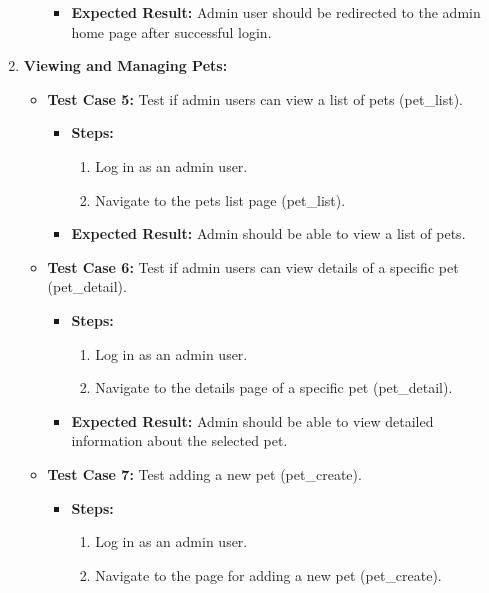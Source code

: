 \begin{enumerate}
\begin{itemize}
\begin{itemize}
            \item \textbf{Expected Result:} Admin user should be redirected to the admin home page after successful login.
        \end{itemize}
    \end{itemize}
    \item \textbf{Viewing and Managing Pets:}
    \begin{itemize}
        \item \textbf{Test Case 5:} Test if admin users can view a list of pets (pet\_list).
        \begin{itemize}
            \item \textbf{Steps:}
            \begin{enumerate}
                \item Log in as an admin user.
                \item Navigate to the pets list page (pet\_list).
            \end{enumerate}
            \item \textbf{Expected Result:} Admin should be able to view a list of pets.
        \end{itemize}
        \item \textbf{Test Case 6:} Test if admin users can view details of a specific pet (pet\_detail).
        \begin{itemize}
            \item \textbf{Steps:}
            \begin{enumerate}
                \item Log in as an admin user.
                \item Navigate to the details page of a specific pet (pet\_detail).
            \end{enumerate}
            \item \textbf{Expected Result:} Admin should be able to view detailed information about the selected pet.
        \end{itemize}
        \item \textbf{Test Case 7:} Test adding a new pet (pet\_create).
        \begin{itemize}
            \item \textbf{Steps:}
            \begin{enumerate}
                \item Log in as an admin user.
                \item Navigate to the page for adding a new pet (pet\_create).

\end{enumerate}
\end{itemize}
\end{itemize}
\end{enumerate}
